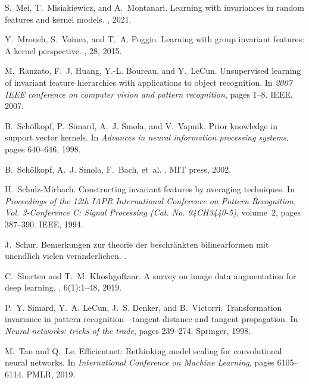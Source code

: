 \documentclass{article}
\theoremstyle{plain}
\theoremstyle{definition}
\theoremstyle{remark}
\begin{document}
\begin{thebibliography}{10}
S.~Mei, T.~Misiakiewicz, and A.~Montanari.
\newblock Learning with invariances in random features and kernel models.
, 2021.

Y.~Mroueh, S.~Voinea, and T.~A. Poggio.
\newblock Learning with group invariant features: A kernel perspective.
, 28, 2015.

M.~Ranzato, F.~J. Huang, Y.-L. Boureau, and Y.~LeCun.
\newblock Unsupervised learning of invariant feature hierarchies with
  applications to object recognition.
\newblock In {\em 2007 IEEE conference on computer vision and pattern
  recognition}, pages 1--8. IEEE, 2007.

B.~Sch{\"o}lkopf, P.~Simard, A.~J. Smola, and V.~Vapnik.
\newblock Prior knowledge in support vector kernels.
\newblock In {\em Advances in neural information processing systems}, pages
  640--646, 1998.

B.~Sch{\"o}lkopf, A.~J. Smola, F.~Bach, et~al.
.
\newblock MIT press, 2002.

H.~Schulz-Mirbach.
\newblock Constructing invariant features by averaging techniques.
\newblock In {\em Proceedings of the 12th IAPR International Conference on
  Pattern Recognition, Vol. 3-Conference C: Signal Processing (Cat. No.
  94CH3440-5)}, volume~2, pages 387--390. IEEE, 1994.

J.~Schur.
\newblock Bemerkungen zur theorie der beschr{\"a}nkten bilinearformen mit
  unendlich vielen ver{\"a}nderlichen.
.

C.~Shorten and T.~M. Khoshgoftaar.
\newblock A survey on image data augmentation for deep learning.
, 6(1):1--48, 2019.

P.~Y. Simard, Y.~A. LeCun, J.~S. Denker, and B.~Victorri.
\newblock Transformation invariance in pattern recognition—tangent distance
  and tangent propagation.
\newblock In {\em Neural networks: tricks of the trade}, pages 239--274.
  Springer, 1998.

M.~Tan and Q.~Le.
\newblock Efficientnet: Rethinking model scaling for convolutional neural
  networks.
\newblock In {\em International Conference on Machine Learning}, pages
  6105--6114. PMLR, 2019.


\end{thebibliography}
\end{document}
